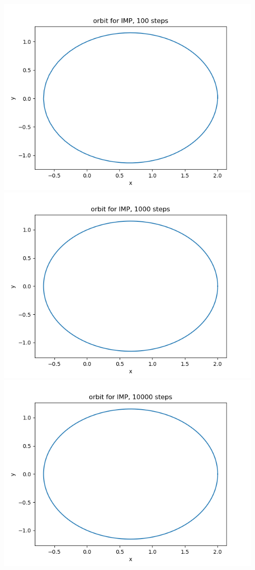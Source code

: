 \documentclass{article}
\begin{document}
\begin{enumerate}
\begin{enumerate}[label=(\alph*)]
	\begin{center}
		\includegraphics[scale=.3]{hw5 IMP orbit 100 steps}
		\includegraphics[scale=.3]{hw5 IMP orbit 1000 steps}
		\includegraphics[scale=.3]{hw5 IMP orbit 10000 steps}

\end{center}
\end{enumerate}
\end{enumerate}
\end{document}
